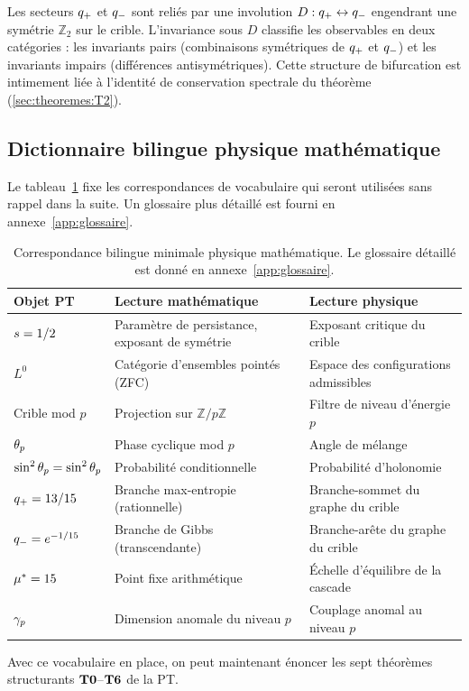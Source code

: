 Les secteurs $q_{+}$ et $q_{-}$ sont reliés par une involution $D : q_{+} \leftrightarrow q_{-}$ engendrant une symétrie $\mathbb{Z}_2$ sur le crible. L'invariance sous $D$ classifie les observables en deux catégories : les invariants pairs (combinaisons symétriques de $q_{+}$ et $q_{-}$) et les invariants impairs (différences antisymétriques). Cette structure de bifurcation est intimement liée à l'identité de conservation spectrale du théorème~\Ttwo{} (\ref{sec:theoremes:T2}).

\subsection{Dictionnaire bilingue physique\,\textendash\,mathématique}
\label{sec:cadre:bilingue}

Le tableau~\ref{tab:bilingue} fixe les correspondances de vocabulaire qui seront utilisées sans rappel dans la suite. Un glossaire plus détaillé est fourni en annexe~\ref{app:glossaire}.

\begin{table}[htbp]
\centering
\small
\begin{tabular}{@{}p{4.2cm}p{5cm}p{5cm}@{}}
\toprule
Objet PT & Lecture mathématique & Lecture physique \\
\midrule
$s = 1/2$ & Paramètre de persistance, exposant de symétrie & Exposant critique du crible \\
$L^0$ & Catégorie d'ensembles pointés (ZFC) & Espace des configurations admissibles \\
Crible mod $p$ & Projection sur $\mathbb{Z}/p\mathbb{Z}$ & Filtre de niveau d'énergie $p$ \\
$\theta_{p}$ & Phase cyclique mod $p$ & Angle de mélange \\
$\sin^{2}\theta_{p} = \sin^2 \theta_{p}$ & Probabilité conditionnelle & Probabilité d'holonomie \\
$q_{+} = 13/15$ & Branche max-entropie (rationnelle) & Branche-sommet du graphe du crible \\
$q_{-} = e^{-1/15}$ & Branche de Gibbs (transcendante) & Branche-arête du graphe du crible \\
$\mu^{*} = 15$ & Point fixe arithmétique & Échelle d'équilibre de la cascade \\
$\gamma_{p}$ & Dimension anomale du niveau $p$ & Couplage anomal au niveau $p$ \\
\bottomrule
\end{tabular}
\caption{Correspondance bilingue minimale physique\,\textendash\,mathématique. Le glossaire détaillé est donné en annexe~\ref{app:glossaire}.}
\label{tab:bilingue}
\end{table}

Avec ce vocabulaire en place, on peut maintenant énoncer les sept théorèmes structurants $\textbf{T0}$--$\textbf{T6}$ de la PT.
